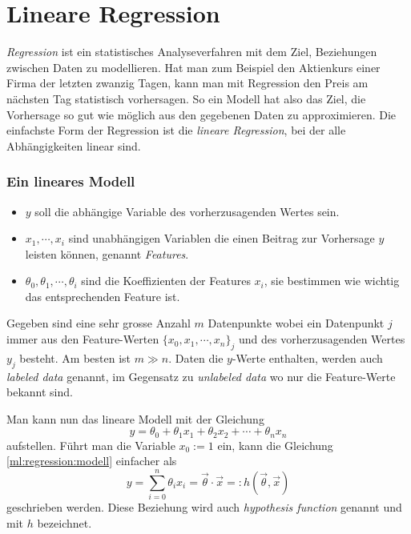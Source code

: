 %
%
%
%

\section{Lineare Regression\label{ml:regression}}

\emph{Regression} ist ein statistisches Analyseverfahren mit dem Ziel, Beziehungen zwischen
Daten zu modellieren. Hat man zum Beispiel den Aktienkurs einer Firma der letzten zwanzig
Tagen, kann man mit Regression den Preis am nächsten Tag statistisch vorhersagen.
So ein Modell hat also das Ziel, die Vorhersage so gut wie möglich aus den gegebenen Daten zu approximieren.
Die einfachste Form der Regression ist die \emph{lineare Regression}, bei der alle Abhängigkeiten linear
sind.

\subsubsection{Ein lineares Modell}
\begin{itemize}
    \item $y$ soll die abhängige Variable des vorherzusagenden Wertes sein.
    \item $x_1, \cdots, x_i$ sind unabhängigen Variablen die einen Beitrag zur Vorhersage
    $y$ leisten können, genannt \emph{Features}.
    \item $\theta_0, \theta_1, \cdots, \theta_i$ sind die Koeffizienten der Features $x_i$,
    sie bestimmen wie wichtig das entsprechenden Feature ist.
\end{itemize}

Gegeben sind eine sehr grosse Anzahl $m$ Datenpunkte wobei ein Datenpunkt $j$ immer aus
den Feature-Werten $\{ x_0, x_1, \cdots, x_n \}_j$ und des vorherzusagenden Wertes $y_j$ besteht.
Am besten ist $m \gg n$. Daten die $y$-Werte enthalten, werden auch \emph{labeled data} genannt,
im Gegensatz zu \emph{unlabeled data} wo nur die Feature-Werte bekannt sind.

Man kann nun das lineare Modell mit der Gleichung
\begin{equation}
y = \theta_0 + \theta_1 x_1 + \theta_2 x_2 + \cdots + \theta_n x_n
\label{ml:regression:modell}
\end{equation}
aufstellen. Führt man die Variable $x_0 := 1$ ein, kann die Gleichung
\ref{ml:regression:modell} einfacher als
\begin{equation}
y = \sum_{i = 0}^{n} \theta_i x_i = \vec \theta \cdot \vec x =: h(\vec\theta, \vec x)
\label{ml:regression:hypothesis}
\end{equation}
geschrieben werden. Diese Beziehung wird auch \emph{hypothesis function} genannt und mit
$h$ bezeichnet.

